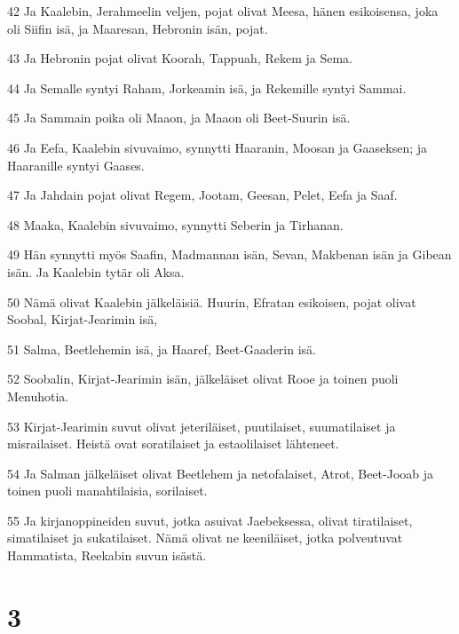 \par 42 Ja Kaalebin, Jerahmeelin veljen, pojat olivat Meesa, hänen esikoisensa, joka oli Siifin isä, ja Maaresan, Hebronin isän, pojat.
\par 43 Ja Hebronin pojat olivat Koorah, Tappuah, Rekem ja Sema.
\par 44 Ja Semalle syntyi Raham, Jorkeamin isä, ja Rekemille syntyi Sammai.
\par 45 Ja Sammain poika oli Maaon, ja Maaon oli Beet-Suurin isä.
\par 46 Ja Eefa, Kaalebin sivuvaimo, synnytti Haaranin, Moosan ja Gaaseksen; ja Haaranille syntyi Gaases.
\par 47 Ja Jahdain pojat olivat Regem, Jootam, Geesan, Pelet, Eefa ja Saaf.
\par 48 Maaka, Kaalebin sivuvaimo, synnytti Seberin ja Tirhanan.
\par 49 Hän synnytti myös Saafin, Madmannan isän, Sevan, Makbenan isän ja Gibean isän. Ja Kaalebin tytär oli Aksa.
\par 50 Nämä olivat Kaalebin jälkeläisiä. Huurin, Efratan esikoisen, pojat olivat Soobal, Kirjat-Jearimin isä,
\par 51 Salma, Beetlehemin isä, ja Haaref, Beet-Gaaderin isä.
\par 52 Soobalin, Kirjat-Jearimin isän, jälkeläiset olivat Rooe ja toinen puoli Menuhotia.
\par 53 Kirjat-Jearimin suvut olivat jeteriläiset, puutilaiset, suumatilaiset ja misrailaiset. Heistä ovat soratilaiset ja estaolilaiset lähteneet.
\par 54 Ja Salman jälkeläiset olivat Beetlehem ja netofalaiset, Atrot, Beet-Jooab ja toinen puoli manahtilaisia, sorilaiset.
\par 55 Ja kirjanoppineiden suvut, jotka asuivat Jaebeksessa, olivat tiratilaiset, simatilaiset ja sukatilaiset. Nämä olivat ne keeniläiset, jotka polveutuvat Hammatista, Reekabin suvun isästä.

\chapter{3}

